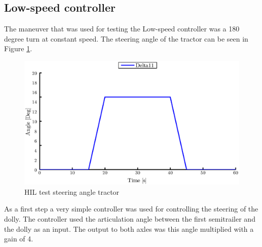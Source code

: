 \documentclass[ExampleMasters.tex]{subfiles}
\begin{document}
%	

\subsection{Low-speed controller}
The maneuver that was used for testing the Low-speed controller was a 180 degree turn at constant speed. The steering angle of the tractor can be seen in Figure \ref{fig:HIL002_delta11}.\\
\begin{figure}[!htb]
	\centering
	\includegraphics[width=1\linewidth]{figures/HIL_delta11}
	\caption{HIL test steering angle tractor}
	
	\label{fig:HIL002_delta11}
\end{figure}
As a first step a very simple controller was used for controlling the steering of the dolly. The controller used the articulation angle between the first semitrailer and the dolly as an input. The output to both axles was this angle multiplied with a gain of 4.
\end{document}
